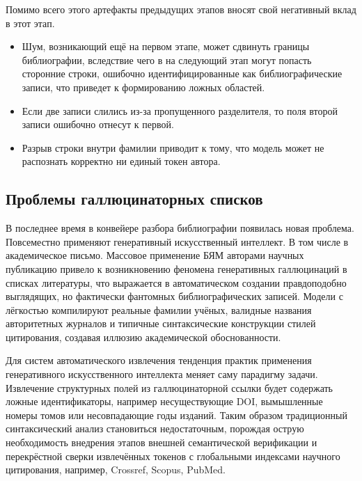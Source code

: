 Помимо всего этого артефакты предыдущих этапов вносят свой негативный вклад в этот этап\cite{tkaczyk2015cermine}. 
\begin{itemize}
    \item Шум, возникающий ещё на первом этапе, может сдвинуть границы библиографии, вследствие чего в на следующий этап могут попасть сторонние строки, ошибочно идентифицированные как библиографические записи, что приведет к формированию ложных областей.
    \item Если две записи слились из-за пропущенного разделителя, то поля второй записи ошибочно отнесут к первой.
    \item Разрыв строки внутри фамилии приводит к тому, что модель может не распознать корректно ни единый токен автора. 
\end{itemize}

\subsection{Проблемы галлюцинаторных списков}
В последнее время в конвейере разбора библиографии появилась новая проблема\cite{zhao2026llm}. Повсеместно применяют генеративный искусственный интеллект. В том числе в академическое письмо. Массовое применение БЯМ авторами научных публикацию привело к возникновению феномена генеративных галлюцинаций в списках литературы, что выражается в автоматическом создании правдоподобно выглядящих, но фактически фантомных библиографических записей. Модели с лёгкостью компилируют реальные фамилии учёных, валидные названия авторитетных журналов и типичные синтаксические конструкции стилей цитирования, создавая иллюзию академической обоснованности\cite{fiorillo2026confabulated}.

Для систем автоматического извлечения тенденция практик применения генеративного искусственного интеллекта меняет саму парадигму задачи. Извлечение структурных полей из галлюцинаторной ссылки будет содержать ложные идентификаторы, например несуществующие DOI, вымышленные номеры томов или несовпадающие годы изданий. Таким образом традиционный синтаксический анализ становиться недостаточным, порождая острую необходимость внедрения этапов внешней семантической верификации и перекрёстной сверки извлечённых токенов с глобальными индексами научного цитирования, например, Crossref, Scopus, PubMed\cite{abbonato2026checkifexist}.

